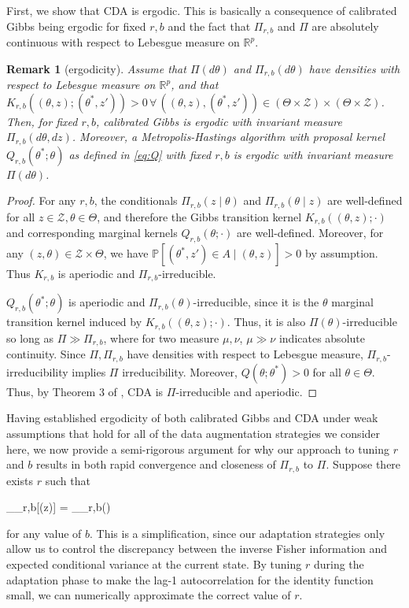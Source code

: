 \documentclass[10pt]{article}
\newtheorem{remark}{Remark}
\newcommand{\be}{\begin{equs}}
\newcommand{\ee}{\end{equs}}
\newcommand{\bb}[1]{\mathbb{#1}}
\newcommand{\mc}[1]{\mathcal{#1}}
\DeclareMathOperator{\var}{var}
\begin{document}
 First, we show that CDA is ergodic. This is basically a consequence of calibrated Gibbs being ergodic for fixed $r,b$ and the fact that $\Pi_{r,b}$ and $\Pi$ are absolutely continuous with respect to Lebesgue measure on $\bb R^p$.
\begin{remark}[ergodicity]
Assume that $\Pi(d\theta)$ and $\Pi_{r,b}(d\theta)$ have densities with respect to Lebesgue measure on $\bb R^p$, and that $K_{r,b}((\theta,z);(\theta^*,z'))>0 \,\forall\, ((\theta,z),(\theta^*,z')) \in (\Theta \times \mc Z) \times (\Theta \times \mc Z)$. Then, for fixed $r,b$, calibrated Gibbs is ergodic with invariant measure $\Pi_{r,b}(d\theta,dz)$. Moreover, a Metropolis-Hastings algorithm with proposal kernel $Q_{r,b}(\theta^*;\theta)$ as defined in \eqref{eq:Q} with fixed $r,b$ is ergodic with invariant measure $\Pi(d\theta)$.
\end{remark}
\begin{proof}
For any $r,b$, the conditionals $\Pi_{r,b}(z \mid \theta)$ and $\Pi_{r,b}(\theta \mid z)$ are well-defined for all $z \in \mc Z, \theta \in \Theta$, and therefore the Gibbs transition kernel $K_{r,b}((\theta,z);\cdot)$ and corresponding marginal kernels $Q_{r,b}(\theta;\cdot)$ are well-defined. Moreover, for any $(z,\theta) \in \mc Z \times \Theta$, we have $\bb P[(\theta^*,z') \in A \mid (\theta,z)] > 0$ by assumption. Thus $K_{r,b}$ is aperiodic and $\Pi_{r,b}$-irreducible.

$Q_{r,b}(\theta^*;\theta)$ is aperiodic and $\Pi_{r,b}(\theta)$-irreducible, since it is the $\theta$ marginal transition kernel induced by $K_{r,b}((\theta,z);\cdot)$. Thus, it is also $\Pi(\theta)$-irreducible so long as $\Pi \gg \Pi_{r,b}$, where for two measure $\mu,\nu$, $\mu \gg \nu$ indicates absolute continuity. Since $\Pi, \Pi_{r,b}$ have densities with respect to Lebesgue measure, $\Pi_{r,b}$-irreducibility implies $\Pi$ irreducibility. Moreover, $Q(\theta;\theta^*) > 0$ for all $\theta \in \Theta$. Thus, by Theorem 3 of \cite{roberts1994simple}, CDA is $\Pi$-irreducible and aperiodic. 
\end{proof}

Having established ergodicity of both calibrated Gibbs and CDA under weak assumptions that hold for all of the data augmentation strategies we consider here, we now provide a semi-rigorous argument for why our approach to tuning $r$ and $b$ results in both rapid convergence and closeness of $\Pi_{r,b}$ to $\Pi$. Suppose there exists $r$ such that
\be
\bb E_{\Pi_{r,b}}[\var(\theta \mid z)] = \var_{\Pi_{r,b}}(\theta)
\ee
for any value of $b$. This is a simplification, since our adaptation strategies only allow us to control the discrepancy between the inverse Fisher information and expected conditional variance at the current state.
By tuning $r$ during the adaptation phase to make the lag-1 autocorrelation for the identity function small, we can numerically approximate the correct value of $r$. 
\end{document}
